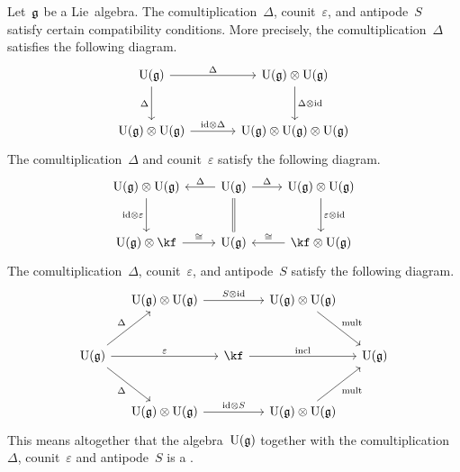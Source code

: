 \begin{remark}
	Let~$\mathfrak{g}$ be a Lie~algebra.
	The comultiplication~$\Delta$, counit~$\varepsilon$, and antipode~$S$ satisfy certain compatibility conditions.
	More precisely, the comultiplication~$\Delta$ satisfies the following  diagram.
	\[
		\begin{tikzcd}[sep = large]
			\Univ(\glie)
			\arrow{r}[above]{\Delta}
			\arrow{d}[left]{\Delta}
			&
			\Univ(\glie) \tensor \Univ(\glie)
			\arrow{d}[right]{\Delta \tensor \id}
			\\
			\Univ(\glie) \tensor \Univ(\glie)
			\arrow{r}[above]{\id \tensor \Delta}
			&
			\Univ(\glie) \tensor \Univ(\glie) \tensor \Univ(\glie)
		\end{tikzcd}
	\]
	The comultiplication~$\Delta$ and counit~$\varepsilon$ satisfy the following  diagram.
	\[
		\begin{tikzcd}[row sep = large]
			\Univ(\glie) \tensor \Univ(\glie)
			\arrow{d}[left]{\id \tensor \varepsilon}
			&
			\Univ(\glie)
			\arrow{l}[above]{\Delta}
			\arrow{r}[above]{\Delta}
			\arrow[equal]{d}
			&
			\Univ(\glie) \tensor \Univ(\glie)
			\arrow{d}[right]{\varepsilon \tensor \id}
			\\
			\Univ(\glie) \tensor \kf
			\arrow{r}[above]{\cong}
			&
			\Univ(\glie)
			&
			\kf \tensor \Univ(\glie)
			\arrow{l}[above]{\cong}
		\end{tikzcd}
	\]
	The comultiplication~$\Delta$, counit~$\varepsilon$, and antipode~$S$ satisfy the following  diagram.
	\[
		\begin{tikzcd}[column sep = small, row sep = large]
			{}
			&
			\Univ(\glie) \tensor \Univ(\glie)
			\arrow{rr}{S \tensor \id}
			&
			{}
			&
			\Univ(\glie) \tensor \Univ(\glie)
			\arrow{dr}{\mathrm{mult}}
			&
			{}
			\\
			\Univ(\glie)
			\arrow{ur}[above left]{\Delta}
			\arrow{rr}[above]{\varepsilon}
			\arrow{dr}[below left]{\Delta}
			&
			{}
			&
			\kf
			\arrow{rr}[above]{\mathrm{incl}}
			&
			{}
			&
			\Univ(\glie)
			\\
			{}
			&
			\Univ(\glie) \tensor \Univ(\glie)
			\arrow{rr}[above]{\id \tensor S}
			&
			{}
			&
			\Univ(\glie) \tensor \Univ(\glie)
			\arrow{ur}[below right]{\mathrm{mult}}
			&
			{}
		\end{tikzcd}
	\]
	This means altogether that the algebra~$\operatorname{U}(\mathfrak{g})$ together with the comultiplication~$\Delta$, counit~$\varepsilon$ and antipode~$S$ is a .
\end{remark}


